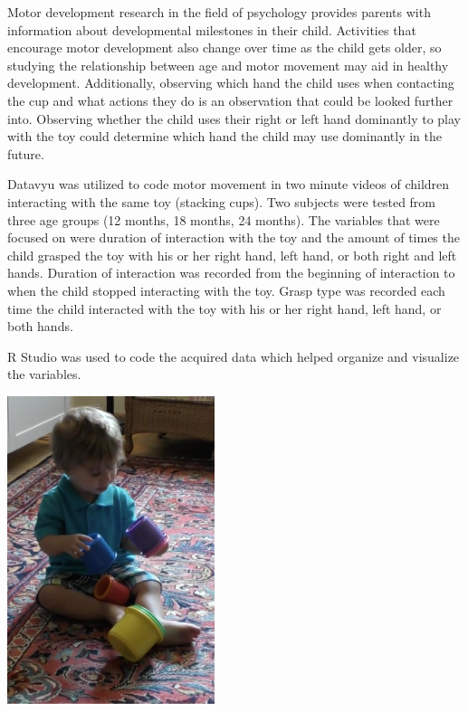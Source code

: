 \documentclass[landscape,final,paperwidth=48in,paperheight=33in,fontscale=0.285]{baposter}
\begin{document}
\begin{poster}
{ Motor development research in the field of psychology provides parents with information about developmental milestones in their child. Activities that encourage motor development also change over time as the child gets older, so studying the relationship between age and motor movement may aid in healthy development. Additionally, observing which hand the child uses when contacting the cup and what actions they do is an observation that could be looked further into. Observing whether the child uses their right or left hand dominantly to play with the toy could determine which hand the child may use dominantly in the future.
    }
    {
\par Datavyu \cite{noauthor_undated-kz} was utilized to code motor movement in two minute videos of children interacting with the same toy (stacking cups). Two subjects were tested from three age groups (12 months, 18 months, 24 months). The variables that were focused on were duration of interaction with the toy and the amount of times the child grasped the toy with his or her right hand, left hand, or both right and left hands. Duration of interaction was recorded from the beginning of interaction to when the child stopped interacting with the toy. Grasp type was recorded each time the child interacted with the toy with his or her right hand, left hand, or both hands.
\par R Studio \cite{RStudio} was used to code the acquired data which helped organize and visualize the variables.
    }
    {
\begin{center}
\vspace{0.3em}
\includegraphics[scale=0.05, height=90mm]{img/grasp.png}
\vspace{0.3em}
\end{center}

}
\end{poster}
\end{document}
